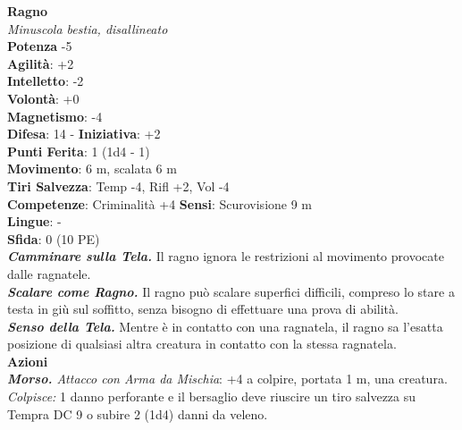 \begin{multicols}{2}
\medskip\textbf{Ragno}\\
\emph{Minuscola bestia, disallineato}\\
\textbf{Potenza} -5\\
\textbf{Agilità}: +2\\
\textbf{Intelletto}: -2\\
\textbf{Volontà}: +0\\
\textbf{Magnetismo}: -4\\
\textbf{Difesa}: 14 - \textbf{Iniziativa}: +2\\
\textbf{Punti Ferita}: 1 (1d4 - 1)\\
\textbf{Movimento}: 6 m, scalata 6 m\\
\textbf{Tiri Salvezza}: Temp -4, Rifl +2, Vol -4 \\
\textbf{Competenze}: Criminalità +4
\textbf{Sensi}: Scurovisione 9 m\\
\textbf{Lingue}: -\\
\textbf{Sfida}: 0 (10 PE)\smallskip\\

\emph{\textbf{Camminare sulla Tela.}} Il ragno ignora le restrizioni al movimento provocate dalle ragnatele.\\

\emph{\textbf{Scalare come Ragno.}} Il ragno può scalare superfici difficili, compreso lo stare a testa in giù sul soffitto, senza bisogno di effettuare una prova di abilità.\\

\emph{\textbf{Senso della Tela.}} Mentre è in contatto con una ragnatela, il ragno sa l'esatta posizione di qualsiasi altra creatura in contatto con la stessa ragnatela.\\

\smallskip\textbf{Azioni}\\

\emph{\textbf{Morso.} Attacco con Arma da Mischia}: +4 a colpire, portata 1 m, una creatura.\\

\emph{Colpisce:} 1 danno perforante e il bersaglio deve riuscire un tiro salvezza su Tempra DC 9 o subire 2 (1d4) danni da veleno.\\



\end{multicols}
